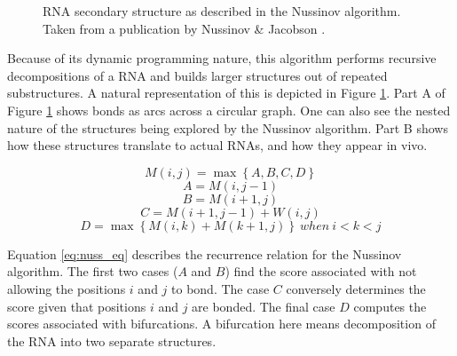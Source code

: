\documentclass[12pt, a4paper]{article}
\begin{document}
\begin{figure}
\begin{center}
\end{center}
\caption{RNA secondary structure as described in the Nussinov algorithm.
Taken from a publication by Nussinov \& Jacobson \cite{nussinov1980fast}.}
\label{nuss_rna}
\end{figure}


Because of its dynamic programming nature, this algorithm performs recursive decompositions of a RNA and builds
larger structures out of repeated substructures. A natural representation of this is
depicted in Figure \ref{nuss_rna}. Part A of Figure \ref{nuss_rna} shows bonds as arcs across a circular
graph. One can also see the nested nature of the structures being explored by the
Nussinov algorithm. Part B shows how these structures translate to actual RNAs, and how they appear in vivo.


\begin{equation} \label{eq:nuss_eq}
	M(i, j) = \max \left\lbrace A, B, C, D \right\rbrace
\end{equation}
\[
A = M(i, j-1)
\]
\[
B = M(i+1, j)
\]
\[
C = M(i+1, j-1) + W(i, j)
\]
\[
D = \max \left\lbrace M(i, k) + M(k+1, j) \right\rbrace \: when \: i < k < j
\]


Equation \ref{eq:nuss_eq} describes the recurrence relation for the Nussinov algorithm. The first two cases ($A$ and $B$) find the score associated with not allowing the positions $i$ and $j$ to bond. The case $C$ conversely determines the score given that positions $i$ and $j$ are bonded. The final case $D$ computes the scores associated with bifurcations. A bifurcation here means decomposition of the RNA into two separate structures.
\end{document}
